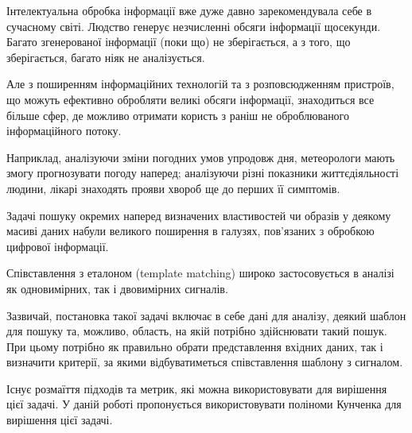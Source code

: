 \intro{}
Інтелектуальна обробка інформації вже дуже давно зарекомендувала себе в сучасному світі.
Людство генерує незчисленні обсяги інформації щосекунди.
Багато згенерованої інформації (поки що) не зберігається, а з того, що зберігається, багато ніяк не аналізується.

Але з поширенням інформаційних технологій та з розповсюдженням пристроїв, що можуть ефективно обробляти великі обсяги
інформації, знаходиться все більше сфер, де можливо отримати користь з раніш не оброблюваного інформаційного потоку.

Наприклад, аналізуючи зміни погодних умов упродовж дня, метеорологи мають змогу прогнозувати погоду наперед;
аналізуючи різні показники життєдіяльності людини, лікарі знаходять прояви хвороб ще до перших її симптомів.

Задачі пошуку окремих наперед визначених властивостей чи образів у деякому масиві даних набули великого поширення в
галузях, пов’язаних з обробкою цифрової інформації.

Співставлення з еталоном (template matching) широко застосовується в аналізі як одновимірних, так і двовимірних
сигналів.

Зазвичай, постановка такої задачі включає в себе дані для аналізу, деякий шаблон для пошуку та, можливо, область, на
якій потрібно здійснювати такий пошук.  При цьому потрібно як правильно обрати представлення вхідних даних, так і
визначити критерії, за якими відбуватиметься співставлення шаблону з сигналом.

Існує розмаїття підходів та метрик, які можна використовувати для вирішення цієї задачі.  У даній роботі пропонується
використовувати поліноми Кунченка для вирішення цієї задачі.

